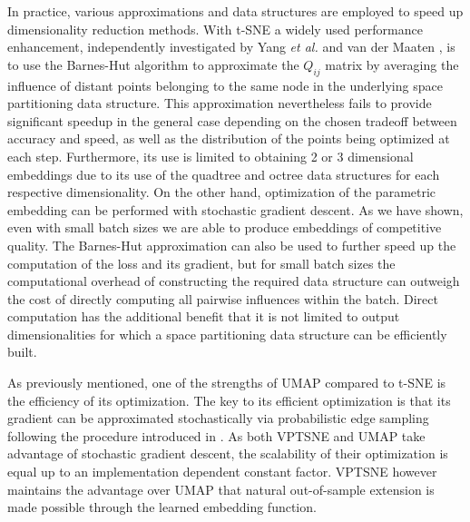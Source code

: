 In practice, various approximations and data structures are employed to speed up dimensionality reduction methods. With t-SNE a widely used performance enhancement, independently investigated by Yang \textit{et al.} \cite{accelerated_tsne_1} and van der Maaten \cite{accelerated_tsne_2}, is to use the Barnes-Hut algorithm \cite{barnes_hut} to approximate the $Q_{ij}$ matrix by averaging the influence of distant points belonging to the same node in the underlying space partitioning data structure. This approximation nevertheless fails to provide significant speedup in the general case depending on the chosen tradeoff between accuracy and speed, as well as the distribution of the points being optimized at each step. Furthermore, its use is limited to obtaining 2 or 3 dimensional embeddings due to its use of the quadtree and octree data structures for each respective dimensionality. On the other hand, optimization of the parametric embedding can be performed with stochastic gradient descent. As we have shown, even with small batch sizes we are able to produce embeddings of competitive quality. The Barnes-Hut approximation can also be used to further speed up the computation of the loss and its gradient, but for small batch sizes the computational overhead of constructing the required data structure can outweigh the cost of directly computing all pairwise influences within the batch. Direct computation has the additional benefit that it is not limited to output dimensionalities for which a space partitioning data structure can be efficiently built.

As previously mentioned, one of the strengths of UMAP compared to t-SNE is the efficiency of its optimization. The key to its efficient optimization is that its gradient can be approximated stochastically via probabilistic edge sampling following the procedure introduced in \cite{largevis}. As both VPTSNE and UMAP take advantage of stochastic gradient descent, the scalability of their optimization is equal up to an implementation dependent constant factor. VPTSNE however maintains the advantage over UMAP that natural out-of-sample extension is made possible through the learned embedding function.

